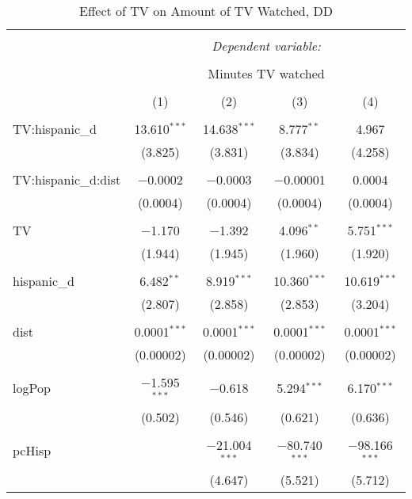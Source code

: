
\begin{table}[!htbp] \centering 
  \caption{Effect of TV on Amount of TV Watched, DD} 
  \label{} 
\begin{tabular}{@{\extracolsep{-5pt}}lcccc} 
\\[-1.8ex]\hline 
\hline \\[-1.8ex] 
 & \multicolumn{4}{c}{\textit{Dependent variable:}} \\ 
\cline{2-5} 
\\[-1.8ex] & \multicolumn{4}{c}{Minutes TV watched} \\ 
\\[-1.8ex] & (1) & (2) & (3) & (4)\\ 
\hline \\[-1.8ex] 
 TV:hispanic\_d & 13.610$^{***}$ & 14.638$^{***}$ & 8.777$^{**}$ & 4.967 \\ 
  & (3.825) & (3.831) & (3.834) & (4.258) \\ 
  & & & & \\ 
 TV:hispanic\_d:dist & $-$0.0002 & $-$0.0003 & $-$0.00001 & 0.0004 \\ 
  & (0.0004) & (0.0004) & (0.0004) & (0.0004) \\ 
  & & & & \\ 
 TV & $-$1.170 & $-$1.392 & 4.096$^{**}$ & 5.751$^{***}$ \\ 
  & (1.944) & (1.945) & (1.960) & (1.920) \\ 
  & & & & \\ 
 hispanic\_d & 6.482$^{**}$ & 8.919$^{***}$ & 10.360$^{***}$ & 10.619$^{***}$ \\ 
  & (2.807) & (2.858) & (2.853) & (3.204) \\ 
  & & & & \\ 
 dist & 0.0001$^{***}$ & 0.0001$^{***}$ & 0.0001$^{***}$ & 0.0001$^{***}$ \\ 
  & (0.00002) & (0.00002) & (0.00002) & (0.00002) \\ 
  & & & & \\ 
 logPop & $-$1.595$^{***}$ & $-$0.618 & 5.294$^{***}$ & 6.170$^{***}$ \\ 
  & (0.502) & (0.546) & (0.621) & (0.636) \\ 
  & & & & \\ 
 pcHisp &  & $-$21.004$^{***}$ & $-$80.740$^{***}$ & $-$98.166$^{***}$ \\ 
  &  & (4.647) & (5.521) & (5.712) \\ 

\end{tabular}
\end{table}
